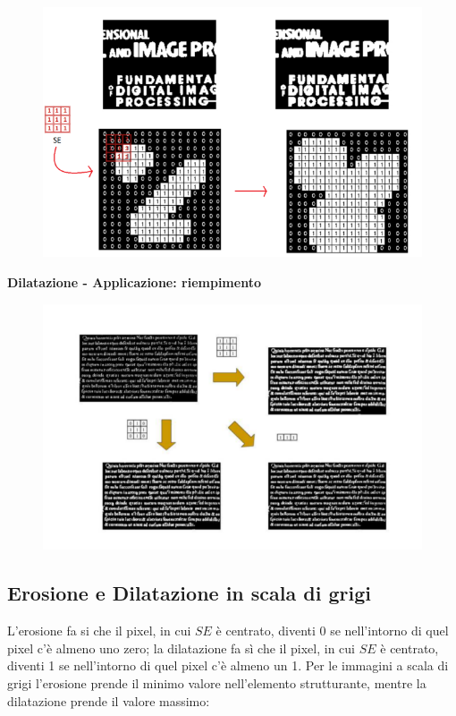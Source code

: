 \begin{figure}[H]
    \centering
    \includegraphics[width=\linewidth, keepaspectratio]{capitoli/immagini/imgs/dilatazione-esempio.png}
\end{figure}

\newpage
\textbf{Dilatazione - Applicazione: riempimento}

\begin{figure}[H]
    \centering
    \includegraphics[width=\linewidth, keepaspectratio]{capitoli/immagini/imgs/dilatazione-applicazione.png}
\end{figure}

\subsection{Erosione e Dilatazione in scala di grigi}

L'erosione fa si che il pixel, in cui $SE$ è centrato, diventi 0 se nell'intorno di quel pixel c'è almeno uno zero; la dilatazione fa sì
che il pixel, in cui $SE$ è centrato, diventi 1 se nell'intorno di quel pixel c'è almeno un 1.
Per le immagini a scala di grigi l'erosione prende il minimo valore nell'elemento strutturante, mentre la dilatazione prende il valore massimo:

